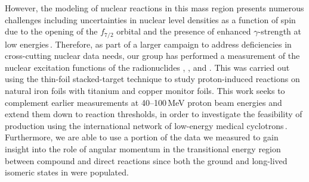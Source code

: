 However, the modeling of nuclear reactions in this mass region presents numerous challenges including uncertainties in nuclear level densities as a function of spin due to the opening of the $f_{7/2}$ orbital and the presence of enhanced $\gamma$-strength at low energies\,\cite{Voinov2004a,Algin2008,Algin2007}.  
Therefore, as part of a larger campaign to address deficiencies in cross-cutting nuclear data needs, our group has performed a   measurement of the   nuclear excitation functions of the radionuclides ,   , and .
This was carried out 
using the thin-foil stacked-target technique to study proton-induced reactions on 
natural iron foils with titanium and copper monitor foils.
This work seeks to complement 
earlier measurements at 40--100\,MeV proton beam energies and extend them down to reaction thresholds, in order to investigate the feasibility of production using the international network   of low-energy medical cyclotrons\,\cite{Graves2016}. 
Furthermore, we are able to use a portion of the data we measured to gain insight into the role of angular momentum in the transitional energy region between compound and direct reactions since both the ground and long-lived isomeric states in  were populated.  


